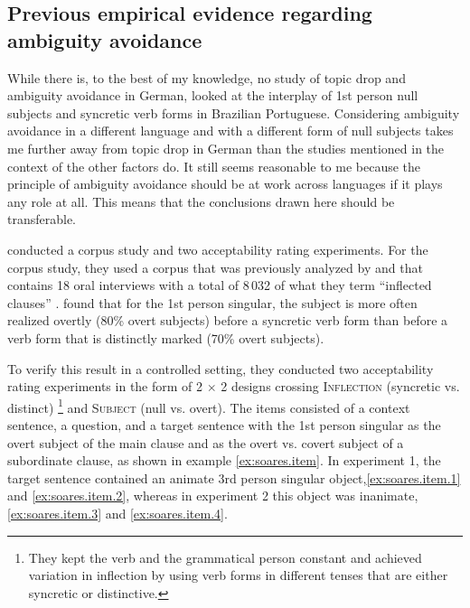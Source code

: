 \subsection{Previous empirical evidence regarding ambiguity avoidance}
\label{sec:usage.ambiguity.studies} 
While there is, to the best of my knowledge, no study of topic drop and ambiguity avoidance in German, \citet{soares.etal2019} looked at the interplay of 1st person null subjects and syncretic  verb forms in Brazilian Portuguese.
Considering ambiguity avoidance in a different language and with a different form of null subjects takes me further away from topic drop in German than the studies mentioned in the context of the other factors do.
It still seems reasonable to me because the principle of ambiguity avoidance should be at work across languages if it plays any role at all.
This means that the conclusions drawn here should be transferable.

\citet{soares.etal2019} conducted a corpus  study and two acceptability rating experiments.
For the corpus study, they used a corpus that was previously analyzed by \citet{duarte1995} and that contains 18 oral interviews with a total of 8\,032 of what they term ``inflected clauses'' \citep[3585]{soares.etal2019}.
\citet[3586--3587]{soares.etal2019} found that for the 1st person singular, the subject is more often realized overtly (80\% overt subjects) before a syncretic verb form than before a verb form that is distinctly marked (70\% overt subjects). 

To verify this result in a controlled setting, they conducted two acceptability rating experiments in the form of 2 $\times$ 2 designs crossing \textsc{Inflection} (syncretic vs. distinct)%
\footnote{They kept the verb and the grammatical person constant and achieved variation in inflection by using verb forms in different tenses that are either syncretic or distinctive.}
%
 and \textsc{Subject} (null vs. overt).
The items consisted of a context sentence, a question, and a target sentence with the 1st person singular as the overt subject of the main clause and as the overt vs. covert subject of a subordinate clause, as shown in example \ref{ex:soares.item}.
In experiment 1, the target sentence contained an animate  3rd person singular object,\ref{ex:soares.item.1} and \ref{ex:soares.item.2}, whereas in experiment 2 this object was inanimate, \ref{ex:soares.item.3} and \ref{ex:soares.item.4}.

